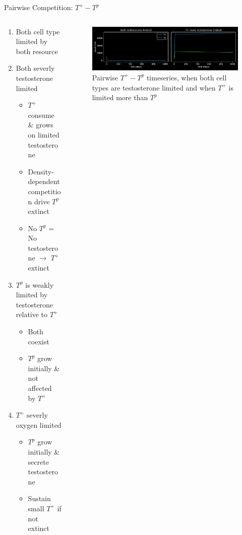 \documentclass[aspectratio=169,9pt]{beamer}
\begin{document}
\begin{frame}{Pairwise Competition: $T^+ - T^p$}
  \begin{columns}
    \begin{column}{0.5\textwidth}
      \begin{enumerate}
        \item<1-> Both cell type limited by both resource
        \item<2-> Both severly testosterone limited
        \begin{itemize}
          \item $T^+$ consume \& grows on limited testosterone
          \item Density-dependent competition drive $T^p$ extinct
          \item No $T^p$ = No testosterone $\rightarrow$ $T^+$ extinct
        \end{itemize}
        \item<3-> $T^p$ is weakly limited by testosterone relative to $T^+$
        \begin{itemize}
          \item Both coexist
          \item $T^p$ grow initially \& not affected by $T^+$
        \end{itemize}
        \item<4-> $T^+$ severly oxygen limited
        \begin{itemize}
          \item $T^p$ grow initially \& secrete testosterone
          \item Sustain small $T^+$ if not extinct
        \end{itemize}
      \end{enumerate}
    \end{column}
    \begin{column}{0.5\textwidth}
      \begin{figure}[h]
      \centering
      \includegraphics[width=\textwidth]{Tpos-Tpro_testlims}
      \caption{Pairwise $T^+ - T^p$ timeseries, when both cell types are testosterone limited and when $T^+$ is limited more than $T^p$}

\end{figure}
\end{column}
\end{columns}
\end{frame}
\end{document}
